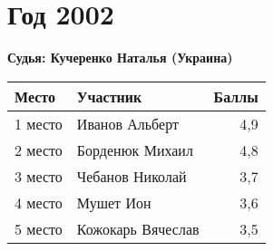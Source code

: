 \chapter{Год 2002}
\textbf{Судья: Кучеренко Наталья (Украина)}

\begin{tabularx}{\textwidth}{l l r}
Место & Участник & Баллы \\
\hline
1 место & Иванов Альберт & 4,9 \\
2 место & Борденюк Михаил & 4,8 \\
3 место & Чебанов Николай & 3,7 \\
4 место & Мушет Ион & 3,6 \\
5 место & Кожокарь Вячеслав & 3,5 \\
\end{tabularx}
